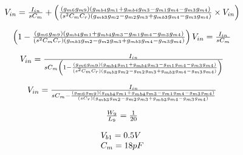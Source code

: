 \begin{equation*}
	\begin{array}{l l}
		V_{in} = \frac{I_{in}}{sC_{m}} + \left( \frac{(g_{m6} g_{m9})(g_{mb4} g_{m1}+g_{mb4} g_{m3}-g_{m1} g_{m4}-g_{m3} g_{m4})}{(s^{2} C_{m} C_{r})(g_{mb3} g_{m2}-g_{m2} g_{m3}+g_{mb3} g_{m4}-g_{m3} g_{m4})}\times V_{in} \right)
	\end{array}
\end{equation*}

\begin{equation*}
	\begin{array}{l l}
		\left(1 - \frac{(g_{m6} g_{m9})(g_{mb4} g_{m1}+g_{mb4} g_{m3}-g_{m1} g_{m4}-g_{m3} g_{m4})}{(s^{2} C_{m} C_{r})(g_{mb3} g_{m2}-g_{m2} g_{m3}+g_{mb3} g_{m4}-g_{m3} g_{m4})} \right) V_{in} = \frac{I_{in}}{sC_{m}}
	\end{array}
\end{equation*}

\begin{equation*}
	\begin{array}{l l}
		V_{in} = \frac{I_{in}}{sC_{m} \left(1 - \frac{(g_{m6} g_{m9})(g_{mb4} g_{m1}+g_{mb4} g_{m3}-g_{m1} g_{m4}-g_{m3} g_{m4})}{(s^{2} C_{m} C_{r})(g_{mb3} g_{m2}-g_{m2} g_{m3}+g_{mb3} g_{m4}-g_{m3} g_{m4})} \right)}
	\end{array}
\end{equation*}

\begin{equation*}
	\begin{array}{l l}
		V_{in} = \frac{I_{in}}{sC_{m} - \frac{(g_{m6} g_{m9})(g_{mb4} g_{m1}+g_{mb4} g_{m3}-g_{m1} g_{m4}-g_{m3} g_{m4})}{(s C_{r})(g_{mb3} g_{m2}-g_{m2} g_{m3}+g_{mb3} g_{m4}-g_{m3} g_{m4})}}
	\end{array}
\end{equation*}


\begin{equation*}
	\begin{array}{l l}
		\frac{W_{9}}{L_{9}}=\frac{1}{20}
	\end{array}
\end{equation*}

\begin{equation*}
	\begin{array}{l l}
		V_{b1}=0.5V \\
		C_{m}=18pF
	\end{array}
\end{equation*}